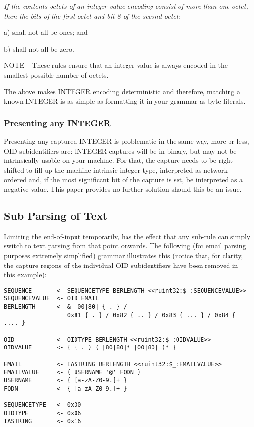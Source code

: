 {\itshape
If the contents octets of an integer value encoding consist of more than 
one octet, then the bits of the first octet and bit 8 of the second octet:

a) shall not all be ones; and

b) shall not all be zero.

NOTE – These rules ensure that an integer value is always encoded in the 
smallest possible number of octets.
}

The above makes INTEGER encoding deterministic and therefore, matching a 
known INTEGER is as simple as formatting it in your grammar as byte 
literals.

\subsubsection{Presenting any INTEGER}
\label{sec:work:ints:presenting}

Presenting any captured INTEGER is problematic in the same way, more or 
less, OID subidentifiers are: INTEGER captures will be in binary, but may 
not be intrinsically usable on your machine. For that, the capture needs 
to be right shifted to fill up the machine intrinsic integer type, 
interpreted as network ordered and, if the most significant bit of the 
capture is set, be interpreted as a negative value. This paper provides no 
further solution should this be an issue.

\subsection{Sub Parsing of Text}

Limiting the end-of-input temporarily, has the effect that any sub-rule 
can simply switch to text parsing from that point onwards. The following 
(for email parsing purposes extremely simplified) grammar illustrates this
(notice that, for clarity, the capture regions of the individual OID
subidentifiers have been removed in this example):

\begin{changemargin}{-60mm}{0mm}
\begin{myquote}
\begin{verbatim}
SEQUENCE       <- SEQUENCETYPE BERLENGTH <<ruint32:$_:SEQUENCEVALUE>>
SEQUENCEVALUE  <- OID EMAIL
BERLENGTH      <- & |00|80| { . } /
                  0x81 { . } / 0x82 { .. } / 0x83 { ... } / 0x84 { .... }

OID            <- OIDTYPE BERLENGTH <<ruint32:$_:OIDVALUE>>
OIDVALUE       <- { ( . ) ( |80|80|* |00|80| )* }

EMAIL          <- IASTRING BERLENGTH <<ruint32:$_:EMAILVALUE>>
EMAILVALUE     <- { USERNAME '@' FQDN }
USERNAME       <- { [a-zA-Z0-9.]+ }
FQDN           <- { [a-zA-Z0-9.]+ }

SEQUENCETYPE   <- 0x30
OIDTYPE        <- 0x06
IASTRING       <- 0x16
\end{verbatim}
\end{myquote}
\end{changemargin}

